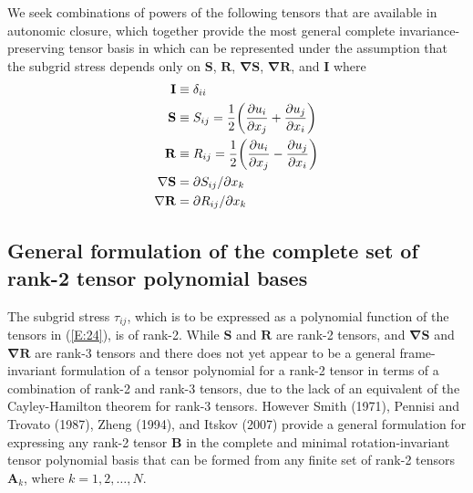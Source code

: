 We seek combinations of powers of the following tensors that are available in autonomic closure, which together provide the most general complete invariance-preserving tensor basis in which   can be represented under the assumption that the subgrid stress depends only on $\mathbf{S}$, $\mathbf{R}$, $\mathbf{\nabla S}$, $\mathbf{\nabla R}$, and $\mathbf{I}$ where
%
\begin{subequations}
\vspace{-0.25in}
\label{E:25}
\begin{align}
 	\mathbf{I} &\equiv \delta_{ii} \\
	\mathbf{S} &\equiv S_{ij} = \frac{1}{2} \bigg( \frac{\partial u_i}{\partial x_j} + \frac{\partial u_j}{ \partial x_i} \bigg)  \\
	\mathbf{R} &\equiv R_{ij} = \frac{1}{2} \bigg( \frac{\partial u_i}{\partial x_j} - \frac{\partial u_j}{ \partial x_i} \bigg) \\
	\mathbf{\nabla S} &= \partial S_{ij}/ \partial x_{k} \\
	\mathbf{\nabla R} &= \partial R_{ij}/ \partial x_{k}
\end{align}
\end{subequations}
%
%    

\subsection{General formulation of the complete set of rank-2 tensor polynomial bases}
\label{sec:2A}

The subgrid stress $\tau_{ij}$, which is to be expressed as a polynomial function of the tensors in (\ref{E:24}), is of rank-2.  While $\mathbf{S}$ and $\mathbf{R}$ are rank-2 tensors,   and  $\mathbf{\nabla S}$ and $\mathbf{\nabla R}$ are rank-3 tensors and there does not yet appear to be a general frame-invariant formulation of a tensor polynomial for a rank-2 tensor in terms of a combination of rank-2 and rank-3 tensors, due to the lack of an equivalent of the Cayley-Hamilton theorem for rank-3 tensors.  However Smith (1971), Pennisi and Trovato (1987), Zheng (1994), and Itskov (2007) provide a general formulation for expressing any rank-2 tensor $\mathbf{B}$ in the complete and minimal rotation-invariant tensor polynomial basis that can be formed from any finite set of rank-2 tensors $\mathbf{A}_{k}$, where $k=1,2,\ldots,N$.

